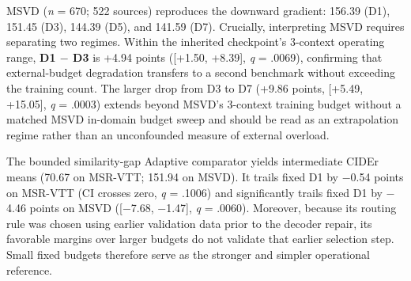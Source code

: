 \documentclass[11pt,a4paper]{article}
\begin{document}
\begin{table}[t]
\centering
\small
\caption{Selected paired test-set contrasts (PTB CIDEr points) with pointwise 95\% source-cluster bootstrap CIs, two-sided sign-flip \emph{p}-values, and within-benchmark BH-adjusted \emph{q}-values (7 contrasts in MSR-VTT; 6 in MSVD; complete tables in Supplementary Table S2).}
\label{tab:3}
\end{table}

MSVD (\emph{n} = 670; 522 sources) reproduces the downward gradient: 156.39 (D1), 151.45 (D3), 144.39 (D5), and 141.59 (D7). Crucially, interpreting MSVD requires separating two regimes. Within the inherited checkpoint's 3-context operating range, \textbf{D1 $-$ D3} is +4.94 points ([+1.50, +8.39], \emph{q} = .0069), confirming that external-budget degradation transfers to a second benchmark without exceeding the training count. The larger drop from D3 to D7 (+9.86 points, [+5.49, +15.05], \emph{q} = .0003) extends beyond MSVD's 3-context training budget without a matched MSVD in-domain budget sweep and should be read as an extrapolation regime rather than an unconfounded measure of external overload.

The bounded similarity-gap Adaptive comparator yields intermediate CIDEr means (70.67 on MSR-VTT; 151.94 on MSVD). It trails fixed D1 by $-$0.54 points on MSR-VTT (CI crosses zero, \emph{q} = .1006) and significantly trails fixed D1 by $-$4.46 points on MSVD ([$-$7.68, $-$1.47], \emph{q} = .0060). Moreover, because its routing rule was chosen using earlier validation data prior to the decoder repair, its favorable margins over larger budgets do not validate that earlier selection step. Small fixed budgets therefore serve as the stronger and simpler operational reference.
\end{document}
